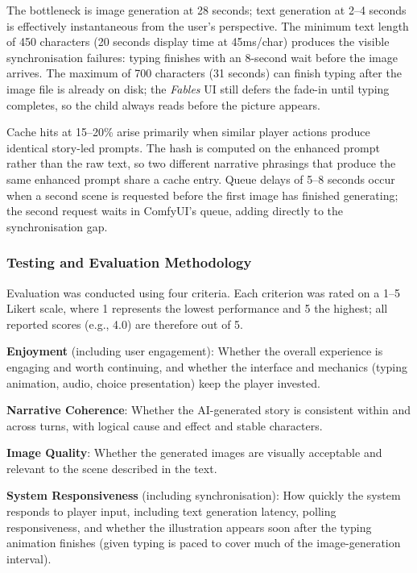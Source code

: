 \documentclass[12pt,a4paper]{article}
\begin{document}
The bottleneck is image generation at 28 seconds; text generation at 2--4 seconds is effectively instantaneous from the user's perspective. The minimum text length of 450 characters (20 seconds display time at 45ms/char) produces the visible synchronisation failures: typing finishes with an 8-second wait before the image arrives. The maximum of 700 characters (31 seconds) can finish typing after the image file is already on disk; the \textit{Fables} UI still defers the fade-in until typing completes, so the child always reads before the picture appears.

Cache hits at 15--20\% arise primarily when similar player actions produce identical story-led prompts. The hash is computed on the enhanced prompt rather than the raw text, so two different narrative phrasings that produce the same enhanced prompt share a cache entry. Queue delays of 5--8 seconds occur when a second scene is requested before the first image has finished generating; the second request waits in ComfyUI's queue, adding directly to the synchronisation gap.

    \subsubsection{Testing and Evaluation Methodology}

Evaluation was conducted using four criteria. Each criterion was rated on a 1--5 Likert scale, where 1 represents the lowest performance and 5 the highest; all reported scores (e.g., 4.0) are therefore out of 5.

\textbf{Enjoyment} (including user engagement): Whether the overall experience is engaging and worth continuing, and whether the interface and mechanics (typing animation, audio, choice presentation) keep the player invested.

\textbf{Narrative Coherence}: Whether the AI-generated story is consistent within and across turns, with logical cause and effect and stable characters.

\textbf{Image Quality}: Whether the generated images are visually acceptable and relevant to the scene described in the text.

\textbf{System Responsiveness} (including synchronisation): How quickly the system responds to player input, including text generation latency, polling responsiveness, and whether the illustration appears soon after the typing animation finishes (given typing is paced to cover much of the image-generation interval).
\end{document}
